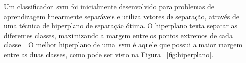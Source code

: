 

Um classificador~\ac{svm} foi inicialmente desenvolvido para problemas de aprendizagem linearmente separáveis e utiliza vetores de separação, através de uma técnica de hiperplano de separação ótima\cite{vapnik95}. O hiperplano tenta separar as diferentes classes, maximizando a margem entre os pontos extremos de cada classe~\cite{valt2010}. O melhor hiperplano de uma~\ac{svm} é aquele que possui a maior margem entre as duas classes, como pode ser visto na Figura ~\ref{fig:hiperplano}.  

